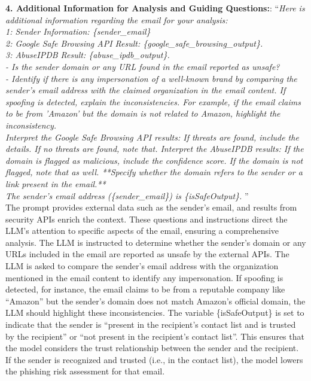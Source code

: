 \noindent \textbf{4. Additional Information for Analysis and Guiding Questions:}: ``\textit{Here is additional information regarding the email for your analysis: \\
        1: Sender Information: \{sender\_email\} \\
        2: Google Safe Browsing API Result: \{google\_safe\_browsing\_output\}.\\
        3: AbuseIPDB Result: \{abuse\_ipdb\_output\}. \\
        - Is the sender domain or any URL found in the email reported as unsafe?\\
        - Identify if there is any impersonation of a well-known brand by comparing the sender’s email address with the claimed organization in the email content. If spoofing is detected, explain the inconsistencies. For example, if the email claims to be from 'Amazon' but the domain is not related to Amazon, highlight the inconsistency.\\
        Interpret the Google Safe Browsing API results: If threats are found, include the details. If no threats are found, note that.
        Interpret the AbuseIPDB results: If the domain is flagged as malicious, include the confidence score. If the domain is not flagged, note that as well. **Specify whether the domain refers to the sender or a link present in the email.** \\
        The sender's email address (\{sender\_email\}) is \{isSafeOutput\}.
        }'' \\
\indent The prompt provides external data such as the sender’s email, and results from security APIs enrich the context. These questions and instructions direct the LLM’s attention to specific aspects of the email, ensuring a comprehensive analysis. The LLM is instructed to determine whether the sender's domain or any URLs included in the email are reported as unsafe by the external APIs. The LLM is asked to compare the sender's email address with the organization mentioned in the email content to identify any impersonation. If spoofing is detected, for instance, the email claims to be from a reputable company like ``Amazon'' but the sender's domain does not match Amazon's official domain, the LLM should highlight these inconsistencies.
The variable \{isSafeOutput\} is set to indicate that the sender is ``present in the recipient's contact list and is trusted by the recipient'' or ``not present in the recipient's contact list''. This ensures that the model considers the trust relationship between the sender and the recipient. If the sender is recognized and trusted (i.e., in the contact list), the model lowers the phishing risk assessment for that email. \\

